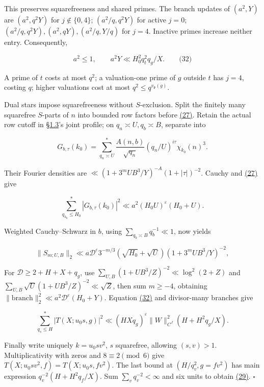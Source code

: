 This preserves squarefreeness and shared primes. The branch updates of \((a^2,Y)\) are \((a^2,q^2Y)\) for \(j\notin\{0,4\}\); \((a^2/q,q^2Y)\) for active \(j=0\); \((a^2/q,q^2Y),(a^2,qY),(a^2/q,Y/q)\) for \(j=4\). Inactive primes increase neither entry. Consequently,

\hypertarget{cf:eq:B.16}{}

\label{cf:eq:B.16}

\[
a^2\le1,\qquad a^2Y\ll H_0^2q_t^2q_g/X.
\qquad\text{(32)}
\]

A prime of \(t\) costs at most \(q^2\); a valuation-one prime of \(g\) outside \(t\) has \(j=4\), costing \(q\); higher valuations cost at most \(q^2\le q^{v_{\mathfrak p}(g)}\).

Dual stars impose squarefreeness without \(S\)-exclusion. Split the finitely many squarefree \(S\)-parts of \(n\) into bounded row factors before \protect\hyperlink{cf:eq:B.11}{(27)}. Retain the actual row cutoff in §\protect\hyperlink{cf:sec:1.2}{1.3}'s joint profile; on \(q_n\asymp U,q_b\asymp B\), separate into

\[
G_{b,\tau}(k_0)=\sum_{q_n\asymp U}^{*}
\frac{A(n,b)}{\sqrt{q_n}}(q_n/U)^{i\tau}\chi_{k_0}(n)^3.
\]

Their Fourier densities are \(\ll(1+3^mUB^3/Y)^{-A}(1+|\tau|)^{-2}\). Cauchy and \protect\hyperlink{cf:eq:B.11}{(27)} give

\[
\sum_{q_{k_0}\le H_0}^{*}|G_{b,\tau}(k_0)|^2
\ll a^2(H_0U)^\varepsilon(H_0+U).
\]

Weighted Cauchy--Schwarz in \(b\), using \(\sum_{q_b\asymp B}q_b^{-1}\ll1\), now yields

\[
\|S_{m;U,B}\|_2
\ll a\mathcal D^\varepsilon3^{-m/3}(\sqrt{H_0}+\sqrt U)
(1+3^mUB^3/Y)^{-2},
\]

For \(\mathcal D\ge2+H+X+q_g\), use \(\sum_{U,B}(1+UB^3/Z)^{-2}\ll\log^2(2+Z)\) and \(\sum_{U,B}\sqrt U(1+UB^3/Z)^{-2}\ll\sqrt Z\), then sum \(m\ge-4\), obtaining \(\|\mathrm{branch}\|_2^2\ll a^2\mathcal D^\varepsilon(H_0+Y)\). Equation \protect\hyperlink{cf:eq:B.16}{(32)} and divisor-many branches give

\[
\sum_{q_s\le H}^{*}|T(X;u_0s,g)|^2
\ll(HXq_g)^\varepsilon\|W\|_{C^J}^2
\left(H+H^2q_g/X\right).
\]

Finally write uniquely \(k=u_0sv^2\), \(s\) squarefree, allowing \((s,v)>1\). Multiplicativity with zeros and \(8\equiv2\pmod6\) give \(T(X;u_0sv^2,f)=T(X;u_0s,fv^2)\). The last bound at \((H/q_v^2,g=fv^2)\) has main expression \(q_v^{-2}(H+H^2q_f/X)\). Sum \(\sum_vq_v^{-2}<\infty\) and six units to obtain \protect\hyperlink{cf:eq:B.13}{(29)}. \(\square\)

